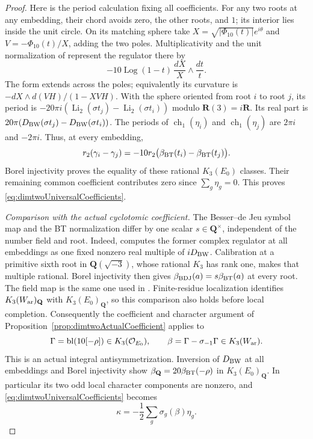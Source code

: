 \documentclass[11pt,a4paper]{article}
\theoremstyle{remark}
\begin{document}
\begin{proof}
Here is the period calculation fixing all coefficients. For any two
roots at any embedding, their chord avoids zero, the other roots,
and $1$; its interior lies inside the unit circle. On its matching
sphere take $X=\sqrt{|\Phi_{10}(t)|}e^{i\theta}$ and
$V=-\Phi_{10}(t)/X$, adding the two poles. Multiplicativity and the
unit normalization of \cite[Proposition~2.8, Theorem~2.31 and
Lemma~4.5]{BunkeTamme} represent the regulator there by
\[
 -10\operatorname{Log}(1-t)\,\frac{dX}{X}\wedge\frac{dt}{t}.
\]
The form extends across the poles; equivalently its curvature is
$-dX\wedge d(VH)/(1-XVH)$. With the sphere oriented from root
$i$ to root $j$, its period is
$-20\pi i(\operatorname{Li}_2(\sigma t_j)
                -\operatorname{Li}_2(\sigma t_i))$ modulo
$\mathbf R(3)=i\mathbf R$. Its real part is
$20\pi(D_{\rm BW}(\sigma t_j)-D_{\rm BW}(\sigma t_i))$.
The periods of $\operatorname{ch}_1(\eta_i)$ and
$\operatorname{ch}_1(\eta_j)$ are $2\pi i$ and $-2\pi i$.
Thus, at every embedding,
\[
 r_2(\gamma_i-\gamma_j)
       =-10r_2\bigl(\beta_{\rm BT}(t_i)-\beta_{\rm BT}(t_j)\bigr).
\]
Borel injectivity \cite{Borel,BunkeTamme} proves the equality of
these rational $K_3(E_0)$ classes. Their remaining common
coefficient contributes zero since $\sum_g\eta_g=0$.
This proves \eqref{eq:dimtwoUniversalCoefficients}.

\emph{Comparison with the actual cyclotomic coefficient.}
The Besser--de Jeu symbol map and the BT normalization differ by
one scalar $s\in\mathbf Q^\times$, independent of the number
field and root. Indeed, \cite[Proposition~4.1 and Remark~5.2]{DeJeuWedge}
computes the former complex regulator at all embeddings as one
fixed nonzero real multiple of $iD_{\rm BW}$. Calibration at a
primitive sixth root in $\mathbf Q(\sqrt{-3})$, whose rational
$K_3$ has rank one, makes that multiple rational. Borel injectivity
then gives $\beta_{\rm BDJ}(a)=s\beta_{\rm BT}(a)$ at every root.
The field map is the same one used in
\cite[Theorem~1.10(1)--(2), Remark~1.7]{BesserDeJeu}.
Finite-residue localization identifies
$K_3(W_{\rm ar})_{\mathbf Q}$ with $K_3(E_0)_{\mathbf Q}$,
so this comparison also holds before local completion.
Consequently the coefficient and character argument of
Proposition~\ref{prop:dimtwoActualCoefficient} applies to
\[
 \Gamma=\operatorname{bl}(10[-\rho])\in K_3(\mathcal O_{E_0}),
 \qquad \beta=\Gamma-\sigma_{-1}\Gamma\in K_3(W_{\rm ar}).
\]
This is an actual integral antisymmetrization. Inversion of
$D_{\rm BW}$ at all embeddings and Borel injectivity show
$\beta_{\mathbf Q}=20\beta_{\rm BT}(-\rho)$ in $K_3(E_0)_{\mathbf Q}$.
In particular its two odd local character components are nonzero,
and \eqref{eq:dimtwoUniversalCoefficients} becomes
\begin{equation}\label{eq:dimtwoExactHalf}
 \kappa=-\frac12\sum_g\sigma_g(\beta)\eta_g.
\end{equation}


\end{proof}
\end{document}
